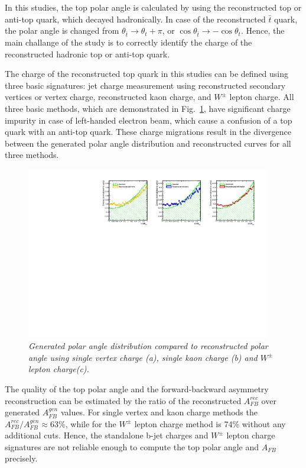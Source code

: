 In this studies, the top polar angle is calculated by using the reconstructed top or anti-top quark, which decayed hadronically.
In case of the reconstructed $\bar{t}$ quark, the polar angle is changed from $\theta_{\bar{t}} \to \theta_{t} + \pi$, or $\cos\theta_{\bar{t}} \to -\cos\theta_{t}$. 
Hence, the main challange of the study is to correctly identify the charge of the reconstructed hadronic top or anti-top quark. 

The charge of the reconstructed top quark in this studies can be defined using three basic signatures: jet charge measurement using reconstructed secondary vertices or vertex charge, reconstructed kaon charge, and $W^\pm$ lepton charge. 
All three basic methods, which are demonstrated in Fig.~\ref{fig:OneCharge_3}, have significant charge impurity in case of left-handed electron beam, which cause a confusion of a top quark with an anti-top quark.
These charge migrations result in the divergence between the generated polar angle distribution and reconstructed curves for all three methods. 

\begin{figure}[h]
	{\centering
		\includegraphics[width=0.95\textwidth]{ILD/plots/one-charge.pdf}
		\caption{\sl Generated polar angle distribution compared to reconstructed polar angle using single vertex charge (a), single kaon charge (b) and $W^\pm$ lepton charge(c).
		}
		\label{fig:OneCharge_3}
	}
	
\end{figure}

The quality of the top polar angle and the forward-backward asymmetry reconstruction can be estimated by the ratio of the reconstructed $A_{FB}^{rec}$ over generated $A^{gen}_{FB}$ values.
For single vertex and kaon charge methods the $A_{FB}^{rec}/A^{gen}_{FB} \approx 63\%$, while for the $W^\pm$ lepton charge method is 74\% without any additional cuts. 
Hence, the standalone b-jet charges and $W^\pm$ lepton charge signatures are not reliable enough to compute the top polar angle and $A_{FB}$ precisely. 
